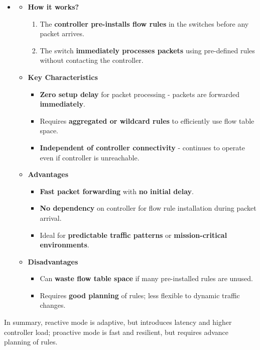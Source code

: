 \begin{itemize}
    \item {}
    \begin{itemize}
        \item[\textcolor{Green3}{\faIcon{question-circle}}] \textcolor{Green3}{\textbf{How it works?}}
        \begin{enumerate}
            \item The \textbf{controller pre-installs flow rules} in the switches before any packet arrives.
            \item The switch \textbf{immediately processes packets} using pre-defined rules without contacting the controller.
        \end{enumerate}
        \item[\textcolor{Green3}{\faIcon{list-ul}}] \textcolor{Green3}{\textbf{Key Characteristics}}
        \begin{itemize}
            \item \textbf{Zero setup delay} for packet processing - packets are forwarded \textbf{immediately}.
            \item Requires \textbf{aggregated or wildcard rules} to efficiently use flow table space.
            \item \textbf{Independent of controller connectivity} - continues to operate even if controller is unreachable.
        \end{itemize}
        \item[\textcolor{Green3}{\faIcon{check-circle}}] \textcolor{Green3}{\textbf{Advantages}}
        \begin{itemize}[label=\textcolor{Green3}{}]
            \item \textbf{Fast packet forwarding} with \textbf{no initial delay}.
            \item \textbf{No dependency} on controller for flow rule installation during packet arrival.
            \item Ideal for \textbf{predictable traffic patterns} or \textbf{mission-critical environments}.
        \end{itemize}
        \item[\textcolor{Red2}{\faIcon{times-circle}}] \textcolor{Red2}{\textbf{Disadvantages}}
        \begin{itemize}[label=\textcolor{Red2}{}]
            \item Can \textbf{waste flow table space} if many pre-installed rules are unused.
            \item Requires \textbf{good planning} of rules; less flexible to dynamic traffic changes.
        \end{itemize}
    \end{itemize}
\end{itemize}
In summary, reactive mode is adaptive, but introduces latency and higher controller load; proactive mode is fast and resilient, but requires advance planning of rules.

